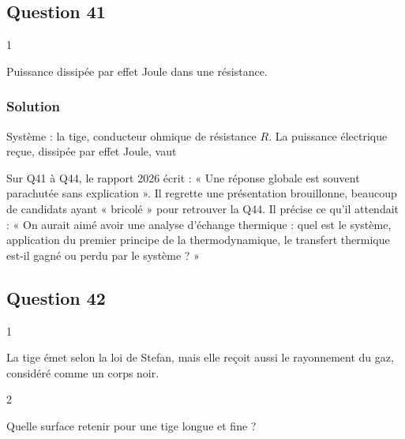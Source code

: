 \documentclass[11pt,a4paper]{article}
\newcommand{\equationajustee}[1]{%
  \sbox{\boiteequation}{$\displaystyle #1$}%
  \ifdim\wd\boiteequation>\linewidth
    \[\resizebox{\linewidth}{!}{\usebox{\boiteequation}}\]%
  \else
    \[#1\]%
  \fi}
\begin{document}
\hypertarget{question-41}{%
\subsection{Question 41}\label{question-41}}

\begin{indication}{1}

Puissance dissipée par effet Joule dans une résistance.

\end{indication}

\hypertarget{solution-40}{%
\subsubsection{Solution}\label{solution-40}}

Système : la tige, conducteur ohmique de résistance \(R\). La puissance électrique reçue, dissipée par effet Joule, vaut
\equationajustee{\boxed{P_{\text{\text{élec}}}=Ri^2=\frac{Li^2}{\gamma\pi a^2}}}

\begin{jury}

Sur Q41 à Q44, le rapport 2026 écrit : « Une réponse globale est souvent parachutée sans explication ». Il regrette une présentation brouillonne, beaucoup de candidats ayant « bricolé » pour retrouver la Q44. Il précise ce qu'il attendait : « On aurait aimé avoir une analyse d'échange thermique : quel est le système, application du premier principe de la thermodynamique, le transfert thermique est-il gagné ou perdu par le système ? »

\end{jury}

\hypertarget{question-42}{%
\subsection{Question 42}\label{question-42}}

\begin{indication}{1}

La tige émet selon la loi de Stefan, mais elle reçoit aussi le rayonnement du gaz, considéré comme un corps noir.

\end{indication}

\begin{indication}{2}

Quelle surface retenir pour une tige longue et fine ?

\end{indication}
\end{document}
